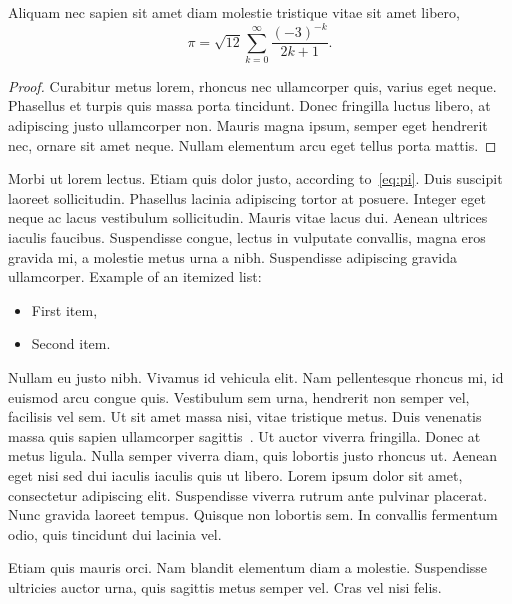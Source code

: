 \documentclass[submission]{gmp2018}
\begin{document}
\begin{theorem}\label{theorem:pi}
Aliquam nec sapien sit amet diam molestie tristique vitae sit amet libero,
\begin{equation}\label{eq:pi}
\pi = \sqrt{12}\sum^\infty_{k=0} \frac{(-3)^{-k}}{2k+1}.
\end{equation}
\end{theorem}

\begin{proof}
Curabitur metus lorem, rhoncus nec ullamcorper quis, varius eget neque. Phasellus et turpis quis massa porta tincidunt. Donec fringilla luctus libero, at adipiscing justo ullamcorper non. Mauris magna ipsum, semper eget hendrerit nec, ornare sit amet neque. Nullam elementum arcu eget tellus porta mattis.
\end{proof}

\noindent
Morbi ut lorem lectus. Etiam quis dolor justo, according to~\eqref{eq:pi}. Duis suscipit laoreet sollicitudin. Phasellus lacinia adipiscing tortor at posuere. Integer eget neque ac lacus vestibulum sollicitudin. Mauris vitae lacus dui. Aenean ultrices iaculis faucibus. Suspendisse congue, lectus in vulputate convallis, magna eros gravida mi, a molestie metus urna a nibh. Suspendisse adipiscing gravida ullamcorper.
%
Example of an itemized list:
\begin{itemize}
  \item First item,
  \item Second item.
\end{itemize}

\noindent
Nullam eu justo nibh. Vivamus id vehicula elit. Nam pellentesque rhoncus mi, id euismod arcu congue quis. Vestibulum sem urna, hendrerit non semper vel, facilisis vel sem. Ut sit amet massa nisi, vitae tristique metus. Duis venenatis massa quis sapien ullamcorper sagittis~\cite{Li:2010:PSO}. Ut auctor viverra fringilla. Donec at metus ligula. Nulla semper viverra diam, quis lobortis justo rhoncus ut. Aenean eget nisi sed dui iaculis iaculis quis ut libero. Lorem ipsum dolor sit amet, consectetur adipiscing elit. Suspendisse viverra rutrum ante pulvinar placerat. Nunc gravida laoreet tempus. Quisque non lobortis sem. In convallis fermentum odio, quis tincidunt dui lacinia vel.

\begin{corollary}
Etiam quis mauris orci. Nam blandit elementum diam a molestie. Suspendisse ultricies auctor urna, quis sagittis metus semper vel. Cras vel nisi felis.
\end{corollary}
\end{document}
